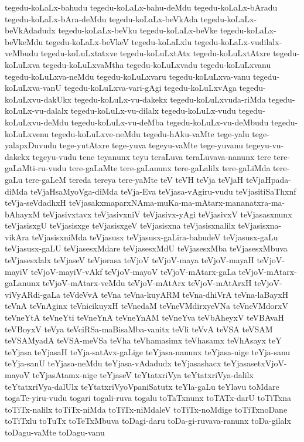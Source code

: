 {tegedu-koLaLx-bahudu
tegedu-koLaLx-bahu-deMdu
tegedu-koLaLx-bAradu
tegedu-koLaLx-bAra-deMdu
tegedu-koLaLx-beVkAda
tegedu-koLaLx-beVkAdadudx
tegedu-koLaLx-beVku
tegedu-koLaLx-beVke
tegedu-koLaLx-beVkeMdu
tegedu-koLaLx-beVkeV
tegedu-koLaLxlu
tegedu-koLaLx-vudilalx-veMbudu
tegedu-koLuLxtatxve
tegedu-koLuLxtAtx
tegedu-koLuLxtAtxre
tegedu-koLuLxva
tegedu-koLuLxvaMtha
tegedu-koLuLxvadu
tegedu-koLuLxvanu
tegedu-koLuLxva-neMdu
tegedu-koLuLxvaru
tegedu-koLuLxva-vanu
tegedu-koLuLxva-vanU
tegedu-koLuLxva-vari-gAgi
tegedu-koLuLxvAga
tegedu-koLuLxvu-dakUkx
tegedu-koLuLx-vu-dakekx
tegedu-koLuLxvuda-riMda
tegedu-koLuLx-vu-dalalx
tegedu-koLuLx-vu-dilalx
tegedu-koLuLx-vudu
tegedu-koLuLxvu-deMdu
tegedu-koLuLx-vu-deMba
tegedu-koLuLx-vu-deMbudu
tegedu-koLuLxvenu
tegedu-koLuLxve-neMdu
tegedu-hAku-vaMte
tege-yalu
tege-yalapxDuvudu
tege-yutAtxre
tege-yuva
tegeyu-vaMte
tege-yuvanu
tegeyu-vu-dakekx
tegeyu-vudu
tene
teyanunx
teyu
teraLuva
teraLuvava-nanunx
tere
tere-gaLaMti-ru-vudu
tere-gaLaMte
tere-gaLanunx
tere-gaLalilx
tere-gaLiMda
tere-gaLu
tere-gaLeM
tereda
tereya
tere-yaMte
teV
teVH
teVja
teVjaH
teVjaHpada-diMda
teVjaHsaMyoVga-diMda
teVja-Eva
teVjasa-vAgiru-vudu
teVjasitiSaThxnf
teVja-seVdadhxH
teVjasakxmaparxNAma-muKa-ma-mAtarx-mananatxra-ma-bAhayxM
teVjasivxtavx
teVjasivxniV
teVjasivx-yAgi
teVjasivxV
teVjasasxnunx
teVjasisxgU
teVjasisxge
teVjasisxgeV
teVjasisxna
teVjasisxnalilx
teVjasisxna-vikAra
teVjasisxniMda
teVjasusx
teVjasusx-gaLira-bahudeV
teVjasusx-gaLu
teVjasusx-gaLU
teVjasesxMdare
teVjasesxMdU
teVjasesxMba
teVjasesxMbuva
teVjasesxlalx
teVjaseV
teVjorasa
teVjoV
teVjoV-maya
teVjoV-mayaH
teVjoV-mayiV
teVjoV-mayiV-vAkf
teVjoV-mayoV
teVjoV-mAtarx-gaLa
teVjoV-mAtarx-gaLanunx
teVjoV-mAtarx-veMdu
teVjoV-mAtArx
teVjoV-mAtArxH
teVjoV-viVyARdi-gaLa
teVdeVvA
teVna
teVna-kuyARM
teVna-dhiVrA
teVna-laBayxH
teVnA
teVnAginx
teVnicikuyxH
teVnedaM
teVneVMdirxyeVNa
teVneVMdorxV
teVneYtA
teVneYti
teVneYnA
teVneYnAM
teVneYva
teVbAheyxV
teVBAvaH
teVBoyxV
teVya
teVciRSa-maBisaMba-vanitx
teVli
teVvA
teVSA
teVSAM
teVSAMyadA
teVSA-meVSa
teVha
teVhamasimx
teVhasamx
teVhAsayx
teY
teYjasa
teYjasaH
teYja-satAvx-gaLige
teYjasa-nanunx
teYjasa-nige
teYja-sanu
teYja-sanU
teYjasa-neMdu
teYjasa-vAdadudx
teYjasashacx
teYjasasetxVjoV-mayoV
teYjasAtamx-nige
teYjaseV
teYtatxriVya
teYtatxriVya-dalilx
teYtatxriVya-dalUlx
teYtatxriVyoVpaniSatutx
teYla-gaLu
teYlavu
toMdare
togaTe-yiru-vudu
togari
togali-ruva
togalu
toTaTxnunx
toTATx-darU
toTiTxna
toTiTx-nalilx
toTiTx-niMda
toTiTx-niMdaleV
toTiTx-noMdige
toTiTxnoDane
toTiTxlu
toTuTx
toTeTxMbuva
toDagi-daru
toDa-gi-ruvava-ranunx
toDa-gilalx
toDagu-vaMte
toDagu-vanu
}
